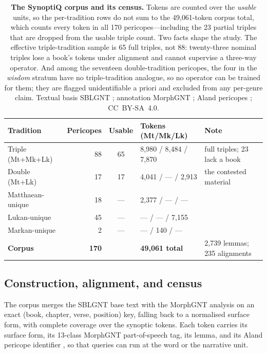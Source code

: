\documentclass[11pt,letterpaper]{article}
\newcommand{\tblhead}{\rowcolor{marine!12}}
\begin{document}
\begin{table}[H]
\centering\small
\begin{tabular}{L{2.8cm} r c l L{3.4cm}}
\toprule
\tblhead\textbf{Tradition} & \textbf{Pericopes} & \textbf{Usable} & \textbf{Tokens (Mt/Mk/Lk)} & \textbf{Note} \\
\midrule
Triple (Mt+Mk+Lk) & 88 & 65 & 8{,}980 / 8{,}484 / 7{,}870 & full triples; 23 lack a book \\
Double (Mt+Lk) & 17 & 17 & 4{,}041 / --- / 2{,}913 & the contested material \\
Matthaean-unique & 18 & --- & 2{,}377 / --- / --- & \\
Lukan-unique & 45 & --- & --- / --- / 7{,}155 & \\
Markan-unique & 2 & --- & --- / 140 / --- & \\
\midrule
{}\textbf{Corpus} & \textbf{170} & & \textbf{49{,}061 total} & 2{,}739 lemmas; 235 alignments \\
\bottomrule
\end{tabular}
\caption{\textbf{The SynoptiQ corpus and its census.} Tokens are counted over the \emph{usable} units, so the per-tradition rows do not sum to the 49{,}061-token corpus total, which counts every token in all 170 pericopes---including the 23 partial triples that are dropped from the usable triple count. Two facts shape the study. The effective triple-tradition sample is 65 full triples, not 88: twenty-three nominal triples lose a book's tokens under alignment and cannot supervise a three-way operator. And among the seventeen double-tradition pericopes, the four in the \emph{wisdom} stratum have no triple-tradition analogue, so no operator can be trained for them; they are flagged unidentifiable a priori and excluded from any per-genre claim. Textual basis SBLGNT \citep{holmes2010}; annotation MorphGNT \citep{tauber2017}; Aland pericopes \citep{aland1996}; CC~BY-SA~4.0.}
\label{tab:corpus}
\end{table}

\subsection{Construction, alignment, and census}

The corpus merges the SBLGNT base text \citep{holmes2010} with the MorphGNT analysis \citep{tauber2017} on an exact (book, chapter, verse, position) key, falling back to a normalised surface form, with complete coverage over the synoptic tokens. Each token carries its surface form, its 13-class MorphGNT part-of-speech tag, its lemma, and its Aland pericope identifier \citep{aland1996}, so that queries can run at the word or the narrative unit.
\end{document}
